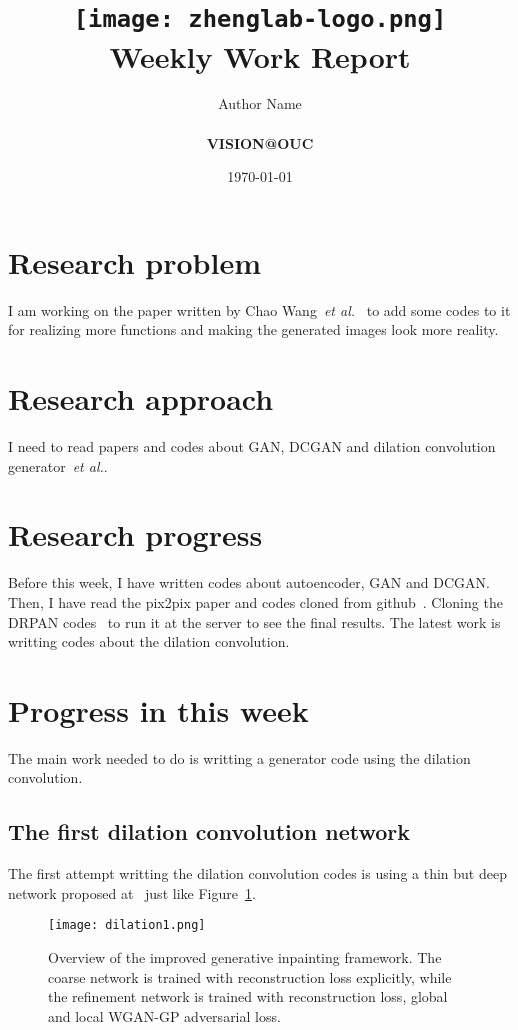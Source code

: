 \documentclass[a4paper]{article}
\title{
    \vspace*{1in}
    \texttt{[image: zhenglab-logo.png]}\\
    \vspace*{1.2in}
    \textbf{\huge Weekly Work Report}
    \vspace{0.2in}
}
\author{Author Name \\
    \vspace*{0.5in} \\
    \textbf{VISION@OUC} \\
    \vspace*{1in}
}
\date{\today}
\begin{document}
\maketitle
\setcounter{page}{0}
\thispagestyle{empty}
\newpage
\section{Research problem}

I am working on the paper written by Chao Wang~\emph{et al.}~\cite{dis} to add some codes to it for realizing more functions and making the generated images look more reality. 

\section{Research approach}

I need to read papers and codes about GAN, DCGAN and dilation convolution generator~\emph{et al.}.

\section{Research progress}

Before this week, I have written codes about autoencoder, GAN and DCGAN. Then, I have read the pix2pix paper and codes cloned from github~\cite{Git}. Cloning the DRPAN codes~\cite{god} to run it at the server to see the final results. The latest work is writting codes about the dilation convolution. 

\section{Progress in this week}

The main work needed to do is writting a generator code using the dilation convolution.

\subsection{The first dilation convolution network}

The first attempt writting the dilation convolution codes is using a thin but deep network proposed at~\cite{Generative} just like Figure~\ref{fig1}.

\begin{figure}[hb]
\begin{center}
\texttt{[image: dilation1.png]}
\end{center}
\caption{Overview of the improved generative inpainting framework. The coarse network is trained with reconstruction loss explicitly, while the refinement network is trained with reconstruction loss, global and local WGAN-GP adversarial loss.}
\label{fig1}
\end{figure}
\end{document}

